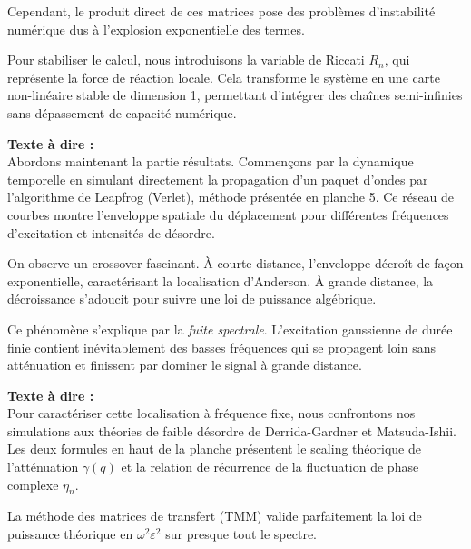 \documentclass[11pt,a4paper]{article}
\begin{document}
\begin{tcolorbox}[colback=blue!5,colframe=blue!75!black,title=Slide 2 : Table des Matières --- 0:45 à 1:15]
\begin{tcolorbox}[colback=blue!5,colframe=blue!75!black,title=Slide 7 : Matrices de Transfert \& Carte de Riccati --- 5:15 à 6:30]
Cependant, le produit direct de ces matrices pose des problèmes d'instabilité numérique dus à l'explosion exponentielle des termes. 

Pour stabiliser le calcul, nous introduisons la variable de Riccati $R_n$, qui représente la force de réaction locale. Cela transforme le système en une carte non-linéaire stable de dimension 1, permettant d'intégrer des chaînes semi-infinies sans dépassement de capacité numérique. \fg{}
\end{tcolorbox}

\begin{tcolorbox}[colback=blue!5,colframe=blue!75!black,title=Slide 8 : Dynamique Temporelle \& Décroissance Algébrique --- 6:30 à 7:30]
\textbf{Texte à dire :} \\
\og Abordons maintenant la partie résultats. Commençons par la dynamique temporelle en simulant directement la propagation d'un paquet d'ondes par l'algorithme de Leapfrog (Verlet), méthode présentée en planche 5. Ce réseau de courbes montre l'enveloppe spatiale du déplacement pour différentes fréquences d'excitation et intensités de désordre. 

On observe un crossover fascinant. À courte distance, l'enveloppe décroît de façon exponentielle, caractérisant la localisation d'Anderson. À grande distance, la décroissance s'adoucit pour suivre une loi de puissance algébrique. 

Ce phénomène s'explique par la \textit{fuite spectrale}. L'excitation gaussienne de durée finie contient inévitablement des basses fréquences qui se propagent loin sans atténuation et finissent par dominer le signal à grande distance. \fg{}
\end{tcolorbox}

\begin{tcolorbox}[colback=blue!5,colframe=blue!75!black,title=Slide 9 : Validation de la Théorie Perturbative (Derrida \& Gardner) --- 7:30 à 8:45]
\textbf{Texte à dire :} \\
\og Pour caractériser cette localisation à fréquence fixe, nous confrontons nos simulations aux théories de faible désordre de Derrida-Gardner et Matsuda-Ishii. Les deux formules en haut de la planche présentent le scaling théorique de l'atténuation $\gamma(q)$ et la relation de récurrence de la fluctuation de phase complexe $\eta_n$.

La méthode des matrices de transfert (TMM) valide parfaitement la loi de puissance théorique en $\omega^2 \varepsilon^2$ sur presque tout le spectre. 


\end{tcolorbox}
\end{tcolorbox}
\end{document}
